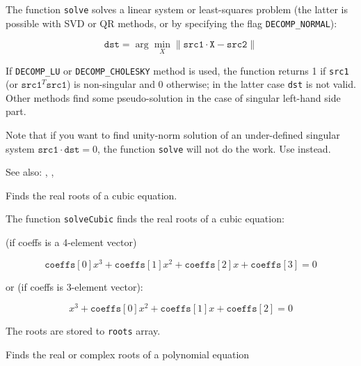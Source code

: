 The function \texttt{solve} solves a linear system or least-squares problem (the latter is possible with SVD or QR methods, or by specifying the flag \texttt{DECOMP\_NORMAL}):

\[
\texttt{dst} = \arg \min_X\|\texttt{src1}\cdot\texttt{X} - \texttt{src2}\|
\]

If \texttt{DECOMP\_LU} or \texttt{DECOMP\_CHOLESKY} method is used, the function returns 1 if \texttt{src1} (or $\texttt{src1}^T\texttt{src1}$) is non-singular and 0 otherwise; in the latter case \texttt{dst} is not valid. Other methods find some pseudo-solution in the case of singular left-hand side part.

Note that if you want to find unity-norm solution of an under-defined singular system $\texttt{src1}\cdot\texttt{dst}=0$, the function \texttt{solve} will not do the work. Use  instead.

See also: , , 

Finds the real roots of a cubic equation.

\begin{description}
\end{description}

The function \texttt{solveCubic} finds the real roots of a cubic equation:

(if coeffs is a 4-element vector)

\[
\texttt{coeffs}[0] x^3 + \texttt{coeffs}[1] x^2 + \texttt{coeffs}[2] x + \texttt{coeffs}[3] = 0
\]

or (if coeffs is 3-element vector):

\[
x^3 + \texttt{coeffs}[0] x^2 + \texttt{coeffs}[1] x + \texttt{coeffs}[2] = 0
\]

The roots are stored to \texttt{roots} array.

Finds the real or complex roots of a polynomial equation

\begin{description}
\end{description}

